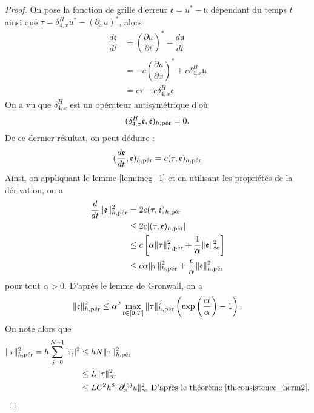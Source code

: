 \begin{proof}
On pose la fonction de grille d'erreur $\mathfrak{e} = u^* - \mathfrak{u}$ dépendant du temps $t$ ainsi que $\mathfrak{\tau} = \delta_{4,x}^H u^* - (\partial_x u)^*$, alors
\begin{align*}
\dfrac{d \mathfrak{e}}{dt} & = \left(\dfrac{\partial u}{\partial t}\right)^* - \dfrac{d \mathfrak{u}}{dt} \\
	& = - c \left( \dfrac{\partial u}{\partial x} \right)^* + c \delta_{4,x}^H \mathfrak{u} \\
	& = c \mathfrak{\tau} - c \delta_{4,x}^H \mathfrak{e}
\end{align*}
On a vu que $\delta_{4,x}^H$ est un opérateur antisymétrique d'où
\begin{equation}
( \delta_{4,x}^H \mathfrak{e}, \mathfrak{e} )_{h,\per} = 0.
\end{equation}
De ce dernier résultat, on peut déduire :
\begin{equation}
( \dfrac{d \mathfrak{e}}{dt} , \mathfrak{e} )_{h,\per} = c ( \mathfrak{\tau}, \mathfrak{e})_{h,\per}
\end{equation}
Ainsi, on appliquant le lemme \ref{lem:ineg_1} et en utilisant les propriétés de la dérivation, on a
\begin{align*}
\dfrac{d}{dt} \|\mathfrak{e}\|_{h,\per}^2 & = 2 c ( \mathfrak{\tau}, \mathfrak{e})_{h,\per} \\
   & \leq 2 c |( \mathfrak{\tau}, \mathfrak{e})_{h,\per}| \\
   & \leq c \left[ \alpha \|\mathfrak{\tau}\|_{h,\per}^2 + \dfrac{1}{\alpha} \|\mathfrak{e}\|_{\infty}^2 \right] \\
   & \leq c \alpha \|\mathfrak{\tau}\|^2_{h,\per} + \dfrac{c}{\alpha} \|\mathfrak{e}\|^2_{h,\per} 
\end{align*}
pour tout $\alpha > 0$.
D'après le lemme de Gronwall, on a
\begin{equation}
\|\mathfrak{e}\|_{h,\per}^2 \leq \alpha^2 \max_{t \in [0,T]} \|\mathfrak{\tau}\|_{h,\per}^2   \left( \exp \left( \dfrac{ct}{\alpha} \right) -1  \right).
\end{equation}
On note alors que
\begin{align*}
\|\mathfrak{\tau}\|_{h,\per}^2 = h \gsum_{j=0}^{N-1} |\mathfrak{\tau_j}|^2 & \leq h N \|\mathfrak{\tau}\|_{h,\per}^2 \\
	& \leq  L \|\mathfrak{\tau}\|_{\infty}^2 \\
	& \leq L C^2 h^8  \| \partial_x^{(5)} u \|_{\infty}^2 \text{ D'après le théorème \ref{th:consistence_herm2}.}

\end{align*}
\end{proof}

